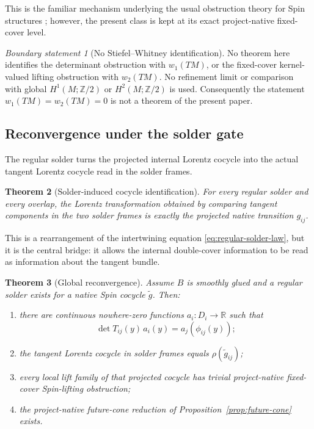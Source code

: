 \documentclass[11pt,a4paper]{article}
\newtheorem{theorem}{Theorem}[section]
\theoremstyle{definition}
\theoremstyle{remark}
\newtheorem{boundary}[theorem]{Boundary statement}
\newcommand{\R}{\mathbb{R}}
\newcommand{\Ztwo}{\mathbb{Z}/2}
\begin{document}
This is the familiar mechanism underlying the usual obstruction theory for
Spin structures \cite{Steenrod,MilnorStasheff,LawsonMichelsohn}; however,
the present class is kept at its exact project-native fixed-cover level.

\begin{boundary}[No Stiefel--Whitney identification]
\label{bdry:no-sw}
No theorem here identifies the determinant obstruction with \(w_1(TM)\),
or the fixed-cover kernel-valued lifting obstruction with \(w_2(TM)\).
No refinement limit or comparison with global
\(H^{1}(M;\Ztwo)\) or \(H^{2}(M;\Ztwo)\) is used.  Consequently the
statement \(w_1(TM)=w_2(TM)=0\) is not a theorem of the present paper.
\end{boundary}

\subsection{Reconvergence under the solder gate}

The regular solder turns the projected internal Lorentz cocycle into the
actual tangent Lorentz cocycle read in the solder frames.

\begin{theorem}[Solder-induced cocycle identification]
\label{thm:cocycle-identification}
For every regular solder and every overlap,
the Lorentz transformation obtained by comparing tangent components in the
two solder frames is exactly the projected native transition \(g_{ij}\).
\end{theorem}

This is a rearrangement of the intertwining equation \eqref{eq:regular-solder-law}, but it is
the central bridge: it allows the internal double-cover information to be
read as information about the tangent bundle.

\begin{theorem}[Global reconvergence]
\label{thm:reconvergence}
Assume \(B\) is smoothly glued and a regular solder exists for a native Spin
cocycle \(\widetilde g\).  Then:
\begin{enumerate}
\item there are continuous nowhere-zero functions
      \(a_i:D_i\to\R\) such that
\[
  \det T_{ij}(y)\,a_i(y)
  =
  a_j(\phi_{ij}(y));
\tag{9.4}\label{eq:orientation-coboundary}
\]
\item the tangent Lorentz cocycle in solder frames equals
      \(\rho(\widetilde g_{ij})\);
\item every local lift family of that projected cocycle has trivial
      project-native fixed-cover Spin-lifting obstruction;
\item the project-native future-cone reduction of
      Proposition~\ref{prop:future-cone} exists.
\end{enumerate}
\end{theorem}
\end{document}
